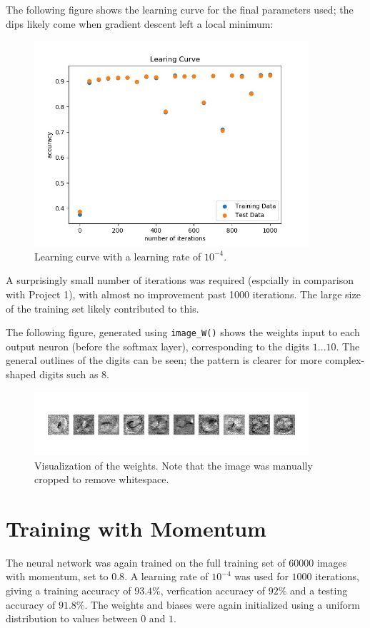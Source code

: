 \documentclass{article}
\begin{document}
   The following figure shows the learning curve for the final parameters used; the dips likely
   come when gradient descent left a local minimum:
     \begin{figure}[H] \centering
         \includegraphics[width=4in]{resources/part4_main}
         \caption{Learning curve with a learning rate of $10^{-4}$. }
      \end{figure}
   A surprisingly small number of iterations was required (espcially in comparison with Project 1), with almost no
   improvement past 1000 iterations. The large size of the training set likely contributed to this.


  The following figure, generated using \texttt{image\_W()} shows the weights input to each
  output neuron (before the softmax layer), corresponding to the digits $1...10$. The general outlines
  of the digits can be seen; the pattern is clearer for more complex-shaped digits such as 8.
     \begin{figure}[H] \centering
         \includegraphics[width=4in]{resources/part4_weights}
         \caption{Visualization of the weights. Note that the image was manually cropped to remove whitespace. }
      \end{figure}





   \section{Training with Momentum}
   The neural network was again trained on the full training set of $60000$ images with momentum, set to $0.8$.
   A learning rate of $10^{-4}$ was used for $1000$ iterations, giving a training accuracy of $93.4\%$,
   verfication accuracy of $92\%$ and a testing accuracy of $91.8\%$.
   The weights and biases were again initialized using a uniform distribution to values between $0$ and $1$.
\end{document}
